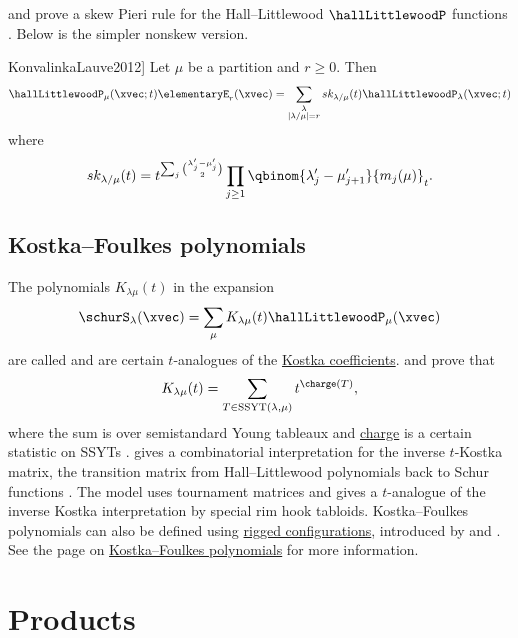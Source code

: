  and  prove a skew Pieri rule
for the Hall--Littlewood $\hallLittlewoodP$ functions
\cite{KonvalinkaLauve2012}.  Below is the simpler nonskew version.

\begin{theorem}[See \cite[Thm.~1]{KonvalinkaLauve2012}]
Let $\mu$ be a partition and $r \geq 0$. Then
\[
\hallLittlewoodP_\mu(\xvec;t) \elementaryE_r(\xvec)
=
\sum_{\substack{ \lambda \\ |\lambda/\mu| = r }}
sk_{\lambda/\mu}(t) \hallLittlewoodP_\lambda(\xvec;t)
\]
where
\[
sk_{\lambda/\mu}(t) =
t^{\sum_{j} \binom{\lambda'_j - \mu'_j}{2} }
\prod_{j\geq 1} \qbinom{ \lambda'_j - \mu'_{j+1}}{ m_j(\mu) }_t.
\]
\end{theorem}


\subsection[kostkaFoulkesPolynomials]{Kostka--Foulkes polynomials}

The polynomials $K_{\lambda\mu}(t)$ in the expansion
\[
\schurS_\lambda(\xvec) = \sum_\mu K_{\lambda\mu}(t) \hallLittlewoodP_\mu(\xvec)
\]
are called  and are
certain $t$-analogues of the
\hyperref[schurCombinatorialFormula]{Kostka coefficients}.
 and  prove that
\[
K_{\lambda\mu}(t) = \sum_{T \in \mathrm{SSYT}(\lambda,\mu)} t^{\charge(T)},
\]
where the sum is over semistandard Young tableaux and
\hyperref[chargeStatistic]{charge} is a certain statistic on SSYTs
\cite{LascouxSchutzenberger78}.
 gives a combinatorial interpretation for the inverse
$t$-Kostka matrix, the transition matrix from Hall--Littlewood polynomials
back to Schur functions \cite{Carbonara1998}.  The model uses tournament
matrices and gives a $t$-analogue of the inverse Kostka interpretation by
special rim hook tabloids.
Kostka--Foulkes polynomials can also be defined using
\hyperref[riggedConfigurations]{rigged configurations},
introduced by  and 
\cite{KirillovReshetikhin1988thebethe}.
See the page on \hyperref[kostkaFoulkes]{Kostka--Foulkes polynomials} for
more information.



\section[hallLittlewoodProducts]{Products}


